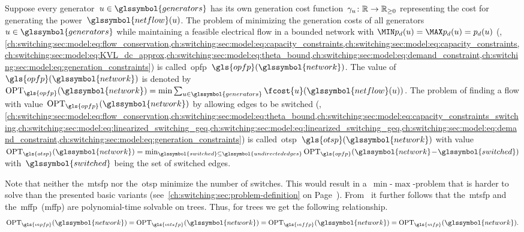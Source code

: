 Suppose every generator~$\vertexa\in\glssymbol{generators}$ has its own
generation cost function~$\gamma_u\colon\mathbb{R}\to\mathbb{R}_{\ge0}$ representing
the cost for generating the power~$\glssymbol{netflow}(\vertexa)$.
%
The problem of minimizing the generation costs of all
generators~$\vertexa\in\glssymbol{generators}$ while maintaining a 
feasible electrical flow in a bounded network with $\realpowerdemandmin(\vertexa) = 
\realpowerdemandmax(\vertexa) = \realpowerdemand(\vertexa)$ (\ie,
% 
\cref{ch:switching:sec:model:eq:flow_conservation,ch:switching:sec:model:eq:capacity_constraints,ch:switching:sec:model:eq:capacity_constraints,ch:switching:sec:model:eq:KVL_dc_approx,ch:switching:sec:model:eq:theta_bound,ch:switching:sec:model:eq:demand_constraint,ch:switching:sec:model:eq:generation_constraints})
% 
is called~\acrlong{opfp}~$\gls{opfp}(\glssymbol{network})$. The
value of~$\gls{opfp}(\glssymbol{network})$ is denoted by~$\opt_{\gls{opfp}}(
\glssymbol{network}) = \min \sum_{\vertexa\in\glssymbol{generators}}
\fcost{\vertexa}(\glssymbol{netflow}(\vertexa))$. The problem of finding
a flow with value~$\opt_{\gls{opfp}}(\glssymbol{network})$
by allowing edges to be switched (\ie,
% 
\cref{ch:switching:sec:model:eq:flow_conservation,ch:switching:sec:model:eq:theta_bound,ch:switching:sec:model:eq:capacity_constraints_switching,ch:switching:sec:model:eq:linearized_switching_geq,ch:switching:sec:model:eq:linearized_switching_geq,ch:switching:sec:model:eq:demand_constraint,ch:switching:sec:model:eq:generation_constraints})
% 
is called~\acrlong{otsp}~$\gls{otsp}(\glssymbol{network})$ with 
value~$\opt_{\gls{otsp}}(\glssymbol{network})=
\min_{\glssymbol{switched}\subseteq\glssymbol{undirectededges}}\opt_{
\gls{opfp}}(
\glssymbol{network}\!-\!
\glssymbol{switched})$ with~$\glssymbol{switched}$ being the set of switched
edges.
% 
\begingroup
    
    \label{ch:switching:problems:OTS-Optimization_problem}
\endgroup
%
Note that neither the~\gls{mtsfp} nor the~\gls{otsp} minimize the number of
switches. This would result in a~$\min$-$\max$-problem  that is harder to solve
than the presented basic variants
(see~\cref{ch:switching:sec:problem-definition} on
Page~\pageref{ch:switching:sec:problem-definition}). From~\textcite[Lemma
4]{Leh15a} it further follows that the~\gls{mtsfp} and
the~\acrlong{mffp}~(\gls{mffp}) are polynomial-time solvable on trees. Thus, for
trees we get the following relationship.
% 
$$\opt_{\gls{mpfp}}(\glssymbol{network}) 
= \opt_{\gls{mtsfp}}(\glssymbol{network})
= \opt_{\gls{mffp}}(\glssymbol{network})
= \opt_{\gls{mfp}}(\glssymbol{network}).
% 
\label{ch:switching:structure:tree}
$$
